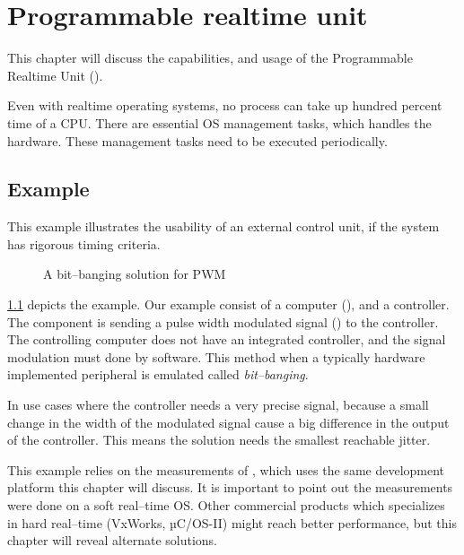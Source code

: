 
\chapter{Programmable realtime unit}
\label{ch:pru}

This chapter will discuss the capabilities, and usage of the Programmable Realtime Unit ().

Even with realtime operating systems, no process can take up hundred percent time of a CPU. There are essential OS management tasks, which handles the hardware. These management tasks need to be executed periodically.

\section{Example}
\label{subsec:example}

This example illustrates the usability of an external control unit, if the system has rigorous timing criteria.

\begin{figure}[h]
	\centering
	\caption{A bit--banging solution for PWM}
	\label{fig:example_pwm}
\end{figure}

\cref{fig:example_pwm} depicts the example. Our example consist of a computer (\rtos), and a controller. The \rtos component is sending a pulse width modulated signal (\pwm) to the controller. The controlling computer does not have an integrated \pwm controller, and the signal modulation must done by software. This method when a typically hardware implemented peripheral is emulated called \emph{bit--banging}.

In use cases where the controller needs a very precise signal, because a small change in the width of the modulated signal cause a big difference in the output of the controller. This means the solution needs the smallest reachable jitter.

This example relies on the measurements of \citep{rt-sched-thesis}, which uses the same development platform this chapter will discuss. It is important to point out the measurements were done on a soft real--time OS. Other commercial products which specializes in hard real--time (VxWorks, µC/OS-II) might reach better performance, but this chapter will reveal alternate solutions.

